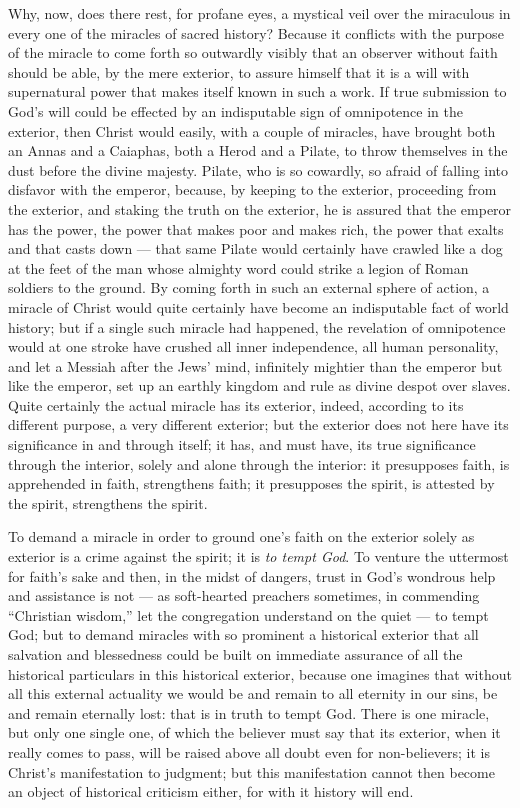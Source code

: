 \documentclass[12pt]{book}
\newcommand{\opage}[1]{\marginnote{\footnotesize\textit{[#1]}}}
\begin{document}
Why, now, does there rest, for profane eyes, a mystical veil over the
miraculous in every one of the miracles of sacred history? Because it
conflicts with the purpose of the miracle to come forth so outwardly
visibly that an observer without faith should be able, by the mere
exterior, to assure himself that it is a will with supernatural power that
makes itself known in such a work. If true submission to God's will could
be effected by an indisputable sign of omnipotence in the exterior, then
Christ would easily, with a couple of miracles, have brought both an Annas
and a Caiaphas, both a Herod and a Pilate, to throw themselves in the dust
before the divine majesty. Pilate, who is so cowardly, so afraid of
falling into disfavor with the emperor, because, by keeping to the
exterior, proceeding from the exterior, and staking the truth on the
exterior, he is assured that the emperor has the power, the power that
makes poor and makes rich, the power that exalts and that casts down ---
that same Pilate would certainly have crawled like a dog at the feet of
the man whose almighty word could strike a legion of Roman soldiers to the
ground. By coming forth in such an external sphere of action, a miracle
of Christ would quite certainly have become an indisputable fact of world
history; but if a single such miracle had happened, the revelation of
omnipotence would at one stroke have crushed all inner independence, all
human
\opage{309}\setcounter{footnote}{0}%
personality, and let a Messiah after the Jews' mind, infinitely mightier
than the emperor but like the emperor, set up an earthly kingdom and rule
as divine despot over slaves. Quite certainly the actual miracle has its
exterior, indeed, according to its different purpose, a very different
exterior; but the exterior does not here have its significance in and
through itself; it has, and must have, its true significance through the
interior, solely and alone through the interior: it presupposes faith, is
apprehended in faith, strengthens faith; it presupposes the spirit, is
attested by the spirit, strengthens the spirit.

To demand a miracle in order to ground one's faith on the exterior solely
as exterior is a crime against the spirit; it is \emph{to tempt God}. To
venture the uttermost for faith's sake and then, in the midst of dangers,
trust
in God's wondrous help and assistance is not --- as soft-hearted preachers
sometimes, in commending ``Christian wisdom,'' let the congregation
understand on the quiet --- to tempt God; but to demand miracles with so
prominent a historical exterior that all salvation and blessedness could
be built on immediate assurance of all the historical particulars in this
historical exterior, because one imagines that without all this external
actuality we would be and remain to all eternity in our sins, be and
remain eternally lost: that is in truth to tempt God. There is one
miracle, but only one single one, of which the believer must say that its
exterior, when it really comes to pass, will be raised above all doubt
even for non-believers; it is Christ's manifestation to judgment; but
this manifestation cannot then become an object of historical criticism
either, for with it history will end.
\end{document}
